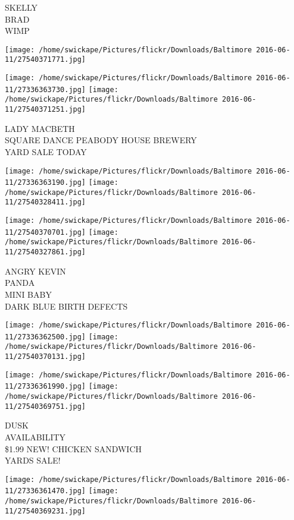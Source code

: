 \documentclass[10pt,letterpaper]{article}
\begin{document}
SKELLY\\
BRAD\\
WIMP
\pagebreak

\texttt{[image: /home/swickape/Pictures/flickr/Downloads/Baltimore 2016-06-11/27540371771.jpg]}

\vspace{0.25in}
\texttt{[image: /home/swickape/Pictures/flickr/Downloads/Baltimore 2016-06-11/27336363730.jpg]}
\texttt{[image: /home/swickape/Pictures/flickr/Downloads/Baltimore 2016-06-11/27540371251.jpg]}

LADY MACBETH\\
SQUARE DANCE PEABODY HOUSE BREWERY\\
YARD SALE TODAY
\pagebreak

\texttt{[image: /home/swickape/Pictures/flickr/Downloads/Baltimore 2016-06-11/27336363190.jpg]}
\texttt{[image: /home/swickape/Pictures/flickr/Downloads/Baltimore 2016-06-11/27540328411.jpg]}

\texttt{[image: /home/swickape/Pictures/flickr/Downloads/Baltimore 2016-06-11/27540370701.jpg]}
\texttt{[image: /home/swickape/Pictures/flickr/Downloads/Baltimore 2016-06-11/27540327861.jpg]}

ANGRY KEVIN\\
PANDA\\
MINI BABY\\
DARK BLUE BIRTH DEFECTS
\pagebreak

\texttt{[image: /home/swickape/Pictures/flickr/Downloads/Baltimore 2016-06-11/27336362500.jpg]}
\texttt{[image: /home/swickape/Pictures/flickr/Downloads/Baltimore 2016-06-11/27540370131.jpg]}

\texttt{[image: /home/swickape/Pictures/flickr/Downloads/Baltimore 2016-06-11/27336361990.jpg]}
\texttt{[image: /home/swickape/Pictures/flickr/Downloads/Baltimore 2016-06-11/27540369751.jpg]}

DUSK\\
AVAILABILITY\\
\$1.99 NEW!  CHICKEN SANDWICH\\
YARDS SALE!
\pagebreak

\texttt{[image: /home/swickape/Pictures/flickr/Downloads/Baltimore 2016-06-11/27336361470.jpg]}
\texttt{[image: /home/swickape/Pictures/flickr/Downloads/Baltimore 2016-06-11/27540369231.jpg]}
\end{document}
